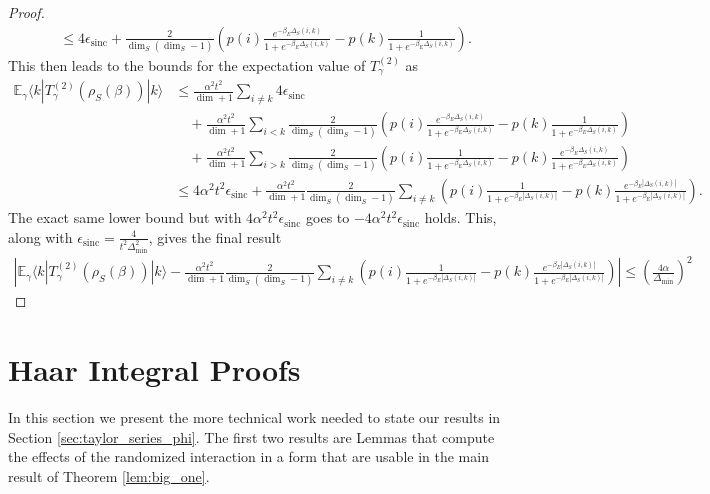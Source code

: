 \documentclass{article}
\newcommand{\ket}[1]{|#1\rangle}
\newcommand{\bra}[1]{\langle #1|}
\newcommand{\parens}[1]{\left( #1 \right)}
\newcommand{\abs}[1]{\left| #1 \right|}
\DeclareMathOperator{\sinc}{sinc}
\begin{document}
\begin{proof}
\begin{align}
        &\leq 4 \epsilon_{\sinc} + \frac{2}{\dim_S (\dim_S - 1)} \parens{p(i) \frac{e^{-\beta_E \Delta_S(i,k)}}{1 + e^{-\beta_E \Delta_S(i,k)}} - p(k) \frac{1}{1 + e^{-\beta_E \Delta_S(i,k)}}}.
    \end{align}
    This then leads to the bounds for the expectation value of $T_{\gamma}^{(2)}$ as 
    \begin{align}
        \mathbb{E}_{\gamma} \bra{k} T_{\gamma}^{(2)}(\rho_S(\beta)) \ket{k} &\leq \frac{\alpha^2 t^2}{\dim + 1} \sum_{i \neq k} 4 \epsilon_{\sinc} \nonumber \\
        &\quad + \frac{\alpha^2 t^2}{\dim + 1} \sum_{i < k} \frac{2}{\dim_S (\dim_S - 1)} \parens{p(i) \frac{e^{-\beta_E \Delta_S(i,k)}}{1 + e^{-\beta_E \Delta_S(i,k)}} - p(k) \frac{1}{1 + e^{-\beta_E \Delta_S(i,k)}}} \nonumber \\
        &\quad + \frac{\alpha^2 t^2}{\dim + 1} \sum_{i > k} \frac{2}{\dim_S (\dim_S - 1)} \parens{p(i) \frac{1}{1 + e^{-\beta_E \Delta_S(i,k)}} - p(k) \frac{e^{-\beta_E \Delta_S(i,k)}}{1 + e^{-\beta_E \Delta_S(i,k)}} } \\
        &\leq 4 \alpha^2 t^2 \epsilon_{\sinc} + \frac{\alpha^2 t^2}{\dim + 1} \frac{2}{\dim_S (\dim_S - 1)} \sum_{i \neq k} \parens{ p(i) \frac{1}{1 + e^{-\beta_E |\Delta_S(i,k)|}}  - p(k) \frac{e^{-\beta_E |\Delta_S(i,k)|}}{1 + e^{-\beta_E |\Delta_S(i,k)|}} }.
    \end{align}
    The exact same lower bound but with $4 \alpha^2 t^2 \epsilon_{\sinc}$ goes to $-4\alpha^2 t^2 \epsilon_{\sinc}$ holds. This, along with $\epsilon_{\sinc} = \frac{4}{t^2 \Delta_{\min}^2}$, gives the final result
    \begin{align}
        \abs{\mathbb{E}_{\gamma} \bra{k} T_{\gamma}^{(2)}(\rho_S(\beta)) \ket{k} - \frac{\alpha^2 t^2}{\dim + 1} \frac{2}{\dim_S (\dim_S - 1)} \sum_{i \neq k} \parens{ p(i) \frac{1}{1 + e^{-\beta_E |\Delta_S(i,k)|}}  - p(k) \frac{e^{-\beta_E |\Delta_S(i,k)|}}{1 + e^{-\beta_E |\Delta_S(i,k)|}} }} \leq  \parens{\frac{4 \alpha}{\Delta_{\min}}}^2
    \end{align}
\end{proof}

\section{Haar Integral Proofs} \label{sec:haar_integral_appendix}

In this section we present the more technical work needed to state our results in Section \ref{sec:taylor_series_phi}. The first two results are Lemmas that compute the effects of the randomized interaction in a form that are usable in the main result of Theorem \ref{lem:big_one}.
\end{document}

